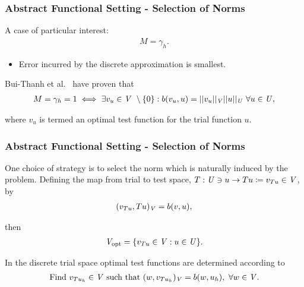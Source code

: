\begin{frame}
\frametitle{Abstract Functional Setting - Selection of Norms}

A case of particular interest:
\begin{align} \label{eq:equal_m_gamma}
M = \gamma_h.
\end{align}

\begin{itemize}
  \item Error incurred by the discrete approximation is smallest.
\end{itemize}
\vspace{5mm}

Bui-Thanh et al.~\cite[Theorem ]{BuiThanh2013} have proven that
\begin{align} \label{eq:bui_thanh_2-6}
M = \gamma_h = 1
\iff
\exists v_u \in \mathit{{{V}}}\ \setminus \{0\} :
b(v_u,u) = ||v_u||_{\mathit{{{V}}}} ||u||_{\mathit{{{U}}}}\ \forall u \in \mathit{{{U}}},
\end{align}

where $v_u$ is termed an optimal test function for the trial function $u$.

\end{frame}

\begin{frame}
\frametitle{Abstract Functional Setting - Selection of Norms}

One choice of strategy is to select the norm which is naturally induced by the
problem. Defining the map from trial to test space,
$T: \mathit{{{U}}} \ni u \rightarrow Tu \coloneqq v_{Tu} \in \mathit{{{V}}} $, by
\begin{align}
(v_{Tu},Tu)_{\mathit{{{V}}}} = b(v,u),
\end{align}

then
\begin{align} \label{eq:def_discrete_test_space_alt}
\mathit{{{V}}}_\text{opt} = \{ v_{T u} \in \mathit{{{V}}} : u \in \mathit{{{U}}} \}.
\end{align}

In the discrete trial space optimal test functions are determined according to
\begin{align} \label{eq:auxiliary_opt_v}
\text{Find}\ v_{T u_h} \in \mathit{{{V}}}\ \text{such that}\
(w,v_{T u_h})_{\mathit{{{V}}}} = b(w,u_h),\ \forall w \in \mathit{{{V}}}.
\end{align}

\end{frame}
